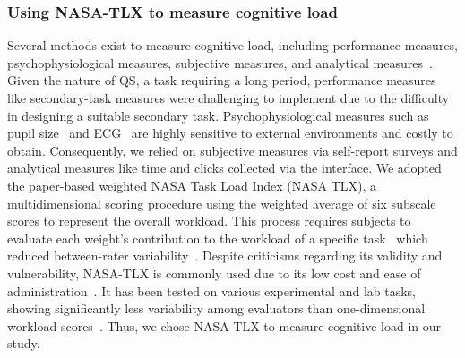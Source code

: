 \subsubsection{Using NASA-TLX to measure cognitive load}
Several methods exist to measure cognitive load, including performance measures, psychophysiological measures, subjective measures, and analytical measures~\cite{gaoMentalWorkloadMeasurement2013}. Given the nature of QS, a task requiring a long period, performance measures like secondary-task measures were challenging to implement due to the difficulty in designing a suitable secondary task. Psychophysiological measures such as pupil size~\cite{palinkoEstimatingCognitiveLoad2010} and ECG~\cite{haapalainenPsychophysiologicalMeasuresAssessing2010} are highly sensitive to external environments and costly to obtain. Consequently, we relied on subjective measures via self-report surveys and analytical measures like time and clicks collected via the interface. We adopted the paper-based weighted NASA Task Load Index (NASA TLX), a multidimensional scoring procedure using the weighted average of six subscale scores to represent the overall workload. This process requires subjects to evaluate each weight's contribution to the workload of a specific task~\cite{hart1988development, hartNasaTaskLoadIndex2006, cain2007review} which reduced between-rater variability~\cite{cain2007review}. Despite criticisms regarding its validity and vulnerability, NASA-TLX is commonly used due to its low cost and ease of administration~\cite{gaoMentalWorkloadMeasurement2013}. It has been tested on various experimental and lab tasks, showing significantly less variability among evaluators than one-dimensional workload scores~\cite{rubioEvaluationSubjectiveMental2004}. Thus, we chose NASA-TLX to measure cognitive load in our study.




